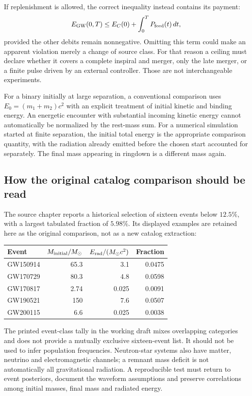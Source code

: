 If replenishment is allowed, the correct inequality instead contains its payment:
\begin{equation}
 E_{\rm GW}(0,T)\leq E_C(0)+\int_0^T P_{\rm feed}(t)\,dt,
 \label{c11:replenished}
\end{equation}
provided the other debits remain nonnegative. Omitting this term could make an apparent violation merely a change of source class. For that reason a ceiling must declare whether it covers a complete inspiral and merger, only the late merger, or a finite pulse driven by an external controller. Those are not interchangeable experiments.

For a binary initially at large separation, a conventional comparison uses $E_0=(m_1+m_2)c^2$ with an explicit treatment of initial kinetic and binding energy. An energetic encounter with substantial incoming kinetic energy cannot automatically be normalized by the rest-mass sum. For a numerical simulation started at finite separation, the initial total energy is the appropriate comparison quantity, with the radiation already emitted before the chosen start accounted for separately. The final mass appearing in ringdown is a different mass again.

\subsection{How the original catalog comparison should be read}
The source chapter reports a historical selection of sixteen events below $12.5\%$, with a largest tabulated fraction of $5.98\%$. Its displayed examples are retained here as the original comparison, not as a new catalog extraction:
\begin{center}
\small\setlength{\tabcolsep}{4pt}
\begin{tabular}{@{}lrrr@{}}
\toprule
Event & $M_{\rm initial}/M_\odot$ & $E_{\rm rad}/(M_\odot c^2)$ & Fraction\\
\midrule
GW150914 &65.3&3.1&0.0475\\
GW170729 &80.3&4.8&0.0598\\
GW170817 &2.74&0.025&0.0091\\
GW190521 &150&7.6&0.0507\\
GW200115 &6.6&0.025&0.0038\\
\bottomrule
\end{tabular}
\end{center}
The printed event-class tally in the working draft mixes overlapping categories and does not provide a mutually exclusive sixteen-event list. It should not be used to infer population frequencies. Neutron-star systems also have matter, neutrino and electromagnetic channels; a remnant mass deficit is not automatically all gravitational radiation. A reproducible test must return to event posteriors, document the waveform assumptions and preserve correlations among initial masses, final mass and radiated energy.

